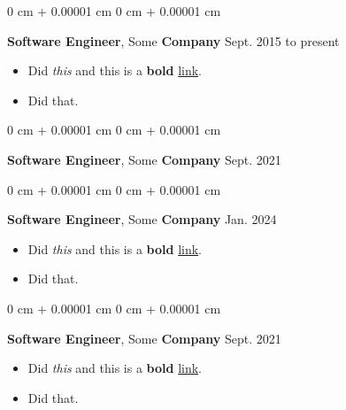 \documentclass[10pt, letterpaper]{article}
\newenvironment{highlights}{
    \begin{itemize}[
        topsep=0.10 cm,
        parsep=0.10 cm,
        partopsep=0pt,
        itemsep=0pt,
        leftmargin=0 cm + 10pt
    ]
}{
    \end{itemize}
        
    \vspace{-0.20cm}
} %
\newenvironment{onecolentry}{
    \begin{adjustwidth}{
        0 cm + 0.00001 cm
    }{
        0 cm + 0.00001 cm
    }
}{
    \end{adjustwidth}
} %
\begin{document}
        \vspace{0.1 cm}

        \begin{onecolentry}
            \textbf{Software Engineer}, Some \textbf{Company} \hfill Sept. 2015 to present
            \begin{highlights}
                \item Did \textit{this} and this is a \textbf{bold} \href{https://example.com}{link}.
                \item Did that.
            \end{highlights}
        \end{onecolentry}

        \vspace{0.1 cm}

        \begin{onecolentry}
            \textbf{Software Engineer}, Some \textbf{Company} \hfill Sept. 2021
        \end{onecolentry}

        \vspace{0.1 cm}

        \begin{onecolentry}
            \textbf{Software Engineer}, Some \textbf{Company} \hfill Jan. 2024
            \begin{highlights}
                \item Did \textit{this} and this is a \textbf{bold} \href{https://example.com}{link}.
                \item Did that.
            \end{highlights}
        \end{onecolentry}

        \vspace{0.1 cm}

        \begin{onecolentry}
            \textbf{Software Engineer}, Some \textbf{Company} \hfill Sept. 2021
            \begin{highlights}
                \item Did \textit{this} and this is a \textbf{bold} \href{https://example.com}{link}.
                \item Did that.
            \end{highlights}
        \end{onecolentry}

        \vspace{0.1 cm}
\end{document}
